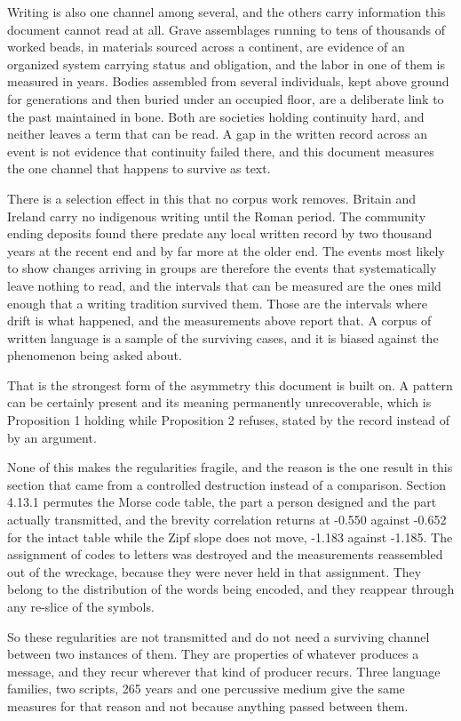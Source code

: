 Writing is also one channel among several, and the others carry information this document cannot read at all. Grave assemblages running to tens of thousands of worked beads, in materials sourced across a continent, are evidence of an organized system carrying status and obligation, and the labor in one of them is measured in years. Bodies assembled from several individuals, kept above ground for generations and then buried under an occupied floor, are a deliberate link to the past maintained in bone. Both are societies holding continuity hard, and neither leaves a term that can be read. A gap in the written record across an event is not evidence that continuity failed there, and this document measures the one channel that happens to survive as text.

There is a selection effect in this that no corpus work removes. Britain and Ireland carry no indigenous writing until the Roman period. The community ending deposits found there predate any local written record by two thousand years at the recent end and by far more at the older end. The events most likely to show changes arriving in groups are therefore the events that systematically leave nothing to read, and the intervals that can be measured are the ones mild enough that a writing tradition survived them. Those are the intervals where drift is what happened, and the measurements above report that. A corpus of written language is a sample of the surviving cases, and it is biased against the phenomenon being asked about.

That is the strongest form of the asymmetry this document is built on. A pattern can be certainly present and its meaning permanently unrecoverable, which is Proposition 1 holding while Proposition 2 refuses, stated by the record instead of by an argument.

None of this makes the regularities fragile, and the reason is the one result in this section that came from a controlled destruction instead of a comparison. Section 4.13.1 permutes the Morse code table, the part a person designed and the part actually transmitted, and the brevity correlation returns at -0.550 against -0.652 for the intact table while the Zipf slope does not move, -1.183 against -1.185. The assignment of codes to letters was destroyed and the measurements reassembled out of the wreckage, because they were never held in that assignment. They belong to the distribution of the words being encoded, and they reappear through any re-slice of the symbols.

So these regularities are not transmitted and do not need a surviving channel between two instances of them. They are properties of whatever produces a message, and they recur wherever that kind of producer recurs. Three language families, two scripts, 265 years and one percussive medium give the same measures for that reason and not because anything passed between them.

